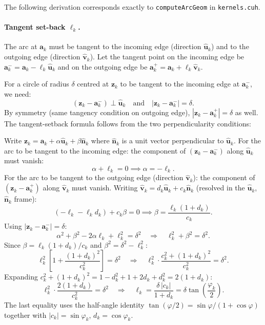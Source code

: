 \documentclass[12pt]{article}
\newcommand{\uvec}{\hat{\mathbf{u}}}
\newcommand{\vvec}{\hat{\mathbf{v}}}
\newcommand{\nvec}{\hat{\mathbf{n}}}
\begin{document}
The following derivation corresponds exactly to \texttt{computeArcGeom} in
\texttt{kernels.cuh}.

\paragraph{Tangent set-back $\ell_k$.}
The arc at $\mathbf{a}_k$ must be tangent to the incoming edge (direction $\uvec_k$)
and to the outgoing edge (direction $\vvec_k$).  Let the tangent point on the incoming
edge be $\mathbf{a}_k^- = \mathbf{a}_k - \ell_k \uvec_k$ and on the outgoing edge
be $\mathbf{a}_k^+ = \mathbf{a}_k + \ell_k \vvec_k$.

For a circle of radius $\delta$ centred at $\mathbf{z}_k$ to be tangent to the
incoming edge at $\mathbf{a}_k^-$, we need:
\[
  (\mathbf{z}_k - \mathbf{a}_k^-) \perp \uvec_k \quad \text{and} \quad
  |\mathbf{z}_k - \mathbf{a}_k^-| = \delta.
\]
By symmetry (same tangency condition on outgoing edge), $|\mathbf{z}_k - \mathbf{a}_k^+|
= \delta$ as well.  The tangent-setback formula follows from the two perpendicularity
conditions:

Write $\mathbf{z}_k = \mathbf{a}_k + \alpha \uvec_k + \beta \nvec_k$ where
$\nvec_k$ is a unit vector perpendicular to $\uvec_k$.  For the arc to be tangent to
the incoming edge: the component of $(\mathbf{z}_k - \mathbf{a}_k^-)$ along $\uvec_k$
must vanish:
\[
  \alpha + \ell_k = 0 \implies \alpha = -\ell_k.
\]
For the arc to be tangent to the outgoing edge (direction $\vvec_k$): the component of
$(\mathbf{z}_k - \mathbf{a}_k^+)$ along $\vvec_k$ must vanish.  Writing
$\vvec_k = d_k \uvec_k + c_k \nvec_k$ (resolved in the $\uvec_k$, $\nvec_k$ frame):
\[
  (-\ell_k - \ell_k d_k) + c_k \beta = 0 \implies
  \beta = \frac{\ell_k (1 + d_k)}{c_k}.
\]
Using $|\mathbf{z}_k - \mathbf{a}_k^-| = \delta$:
\[
  \alpha^2 + \beta^2 - 2\alpha\ell_k + \ell_k^2 = \delta^2 \quad\Longrightarrow\quad
  \ell_k^2 + \beta^2 = \delta^2.
\]
Since $\beta = \ell_k(1+d_k)/c_k$ and $\beta^2 = \delta^2 - \ell_k^2$:
\[
  \ell_k^2 \left[1 + \frac{(1+d_k)^2}{c_k^2}\right] = \delta^2 \quad\Longrightarrow\quad
  \ell_k^2 \cdot \frac{c_k^2 + (1+d_k)^2}{c_k^2} = \delta^2.
\]
Expanding $c_k^2 + (1+d_k)^2 = 1 - d_k^2 + 1 + 2d_k + d_k^2 = 2(1 + d_k)$:
\[
  \ell_k^2 \cdot \frac{2(1+d_k)}{c_k^2} = \delta^2
  \quad\Longrightarrow\quad
  \boxed{\ell_k = \frac{\delta\, |c_k|}{1 + d_k} = \delta \tan\!\left(\frac{\varphi_k}{2}\right).}
\]
The last equality uses the half-angle identity $\tan(\varphi/2) = \sin\varphi/(1+\cos\varphi)$
together with $|c_k| = \sin\varphi_k$, $d_k = \cos\varphi_k$.
\end{document}
